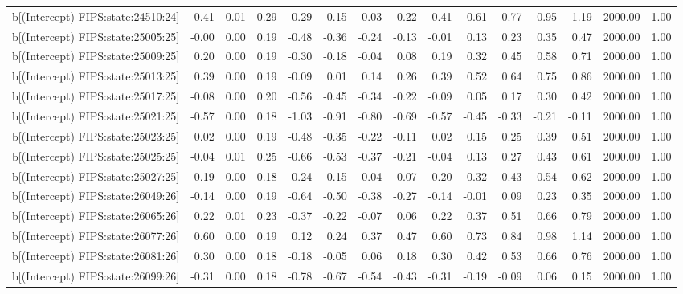 \begin{table}[ht]
\begin{tabular}{rrrrrrrrrrrrrrr}
  b[(Intercept) FIPS:state:24510:24] & 0.41 & 0.01 & 0.29 & -0.29 & -0.15 & 0.03 & 0.22 & 0.41 & 0.61 & 0.77 & 0.95 & 1.19 & 2000.00 & 1.00 \\ 
  b[(Intercept) FIPS:state:25005:25] & -0.00 & 0.00 & 0.19 & -0.48 & -0.36 & -0.24 & -0.13 & -0.01 & 0.13 & 0.23 & 0.35 & 0.47 & 2000.00 & 1.00 \\ 
  b[(Intercept) FIPS:state:25009:25] & 0.20 & 0.00 & 0.19 & -0.30 & -0.18 & -0.04 & 0.08 & 0.19 & 0.32 & 0.45 & 0.58 & 0.71 & 2000.00 & 1.00 \\ 
  b[(Intercept) FIPS:state:25013:25] & 0.39 & 0.00 & 0.19 & -0.09 & 0.01 & 0.14 & 0.26 & 0.39 & 0.52 & 0.64 & 0.75 & 0.86 & 2000.00 & 1.00 \\ 
  b[(Intercept) FIPS:state:25017:25] & -0.08 & 0.00 & 0.20 & -0.56 & -0.45 & -0.34 & -0.22 & -0.09 & 0.05 & 0.17 & 0.30 & 0.42 & 2000.00 & 1.00 \\ 
  b[(Intercept) FIPS:state:25021:25] & -0.57 & 0.00 & 0.18 & -1.03 & -0.91 & -0.80 & -0.69 & -0.57 & -0.45 & -0.33 & -0.21 & -0.11 & 2000.00 & 1.00 \\ 
  b[(Intercept) FIPS:state:25023:25] & 0.02 & 0.00 & 0.19 & -0.48 & -0.35 & -0.22 & -0.11 & 0.02 & 0.15 & 0.25 & 0.39 & 0.51 & 2000.00 & 1.00 \\ 
  b[(Intercept) FIPS:state:25025:25] & -0.04 & 0.01 & 0.25 & -0.66 & -0.53 & -0.37 & -0.21 & -0.04 & 0.13 & 0.27 & 0.43 & 0.61 & 2000.00 & 1.00 \\ 
  b[(Intercept) FIPS:state:25027:25] & 0.19 & 0.00 & 0.18 & -0.24 & -0.15 & -0.04 & 0.07 & 0.20 & 0.32 & 0.43 & 0.54 & 0.62 & 2000.00 & 1.00 \\ 
  b[(Intercept) FIPS:state:26049:26] & -0.14 & 0.00 & 0.19 & -0.64 & -0.50 & -0.38 & -0.27 & -0.14 & -0.01 & 0.09 & 0.23 & 0.35 & 2000.00 & 1.00 \\ 
  b[(Intercept) FIPS:state:26065:26] & 0.22 & 0.01 & 0.23 & -0.37 & -0.22 & -0.07 & 0.06 & 0.22 & 0.37 & 0.51 & 0.66 & 0.79 & 2000.00 & 1.00 \\ 
  b[(Intercept) FIPS:state:26077:26] & 0.60 & 0.00 & 0.19 & 0.12 & 0.24 & 0.37 & 0.47 & 0.60 & 0.73 & 0.84 & 0.98 & 1.14 & 2000.00 & 1.00 \\ 
  b[(Intercept) FIPS:state:26081:26] & 0.30 & 0.00 & 0.18 & -0.18 & -0.05 & 0.06 & 0.18 & 0.30 & 0.42 & 0.53 & 0.66 & 0.76 & 2000.00 & 1.00 \\ 
  b[(Intercept) FIPS:state:26099:26] & -0.31 & 0.00 & 0.18 & -0.78 & -0.67 & -0.54 & -0.43 & -0.31 & -0.19 & -0.09 & 0.06 & 0.15 & 2000.00 & 1.00 \\ 

\end{tabular}
\end{table}
